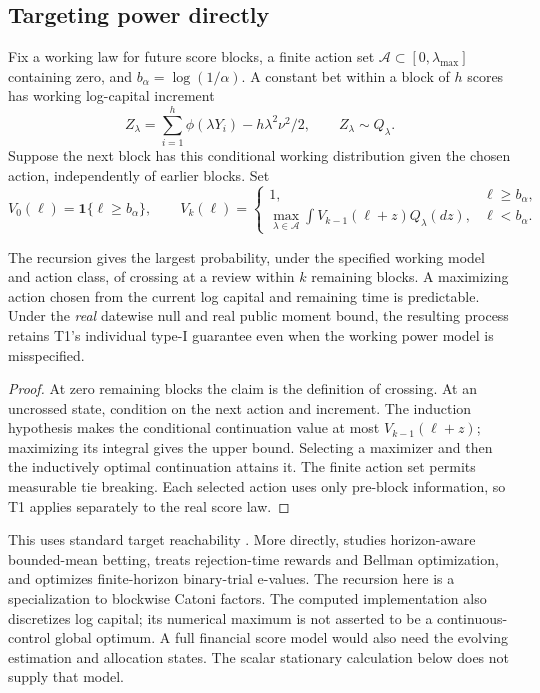 \subsection{Targeting power directly}
Fix a working law for future score blocks, a finite action set
$\mathcal A\subset[0,\lambda_{\max}]$ containing zero, and
$b_\alpha=\log(1/\alpha)$. A constant bet within a block of $h$ scores has
working log-capital increment
\[
 Z_\lambda=\sum_{i=1}^h\phi(\lambda Y_i)-h\lambda^2\nu^2/2,
 \qquad Z_\lambda\sim Q_\lambda.
\]
Suppose the next block has this conditional working distribution given the
chosen action, independently of earlier blocks. Set
\begin{equation}
 V_0(\ell)=\mathbf1\{\ell\ge b_\alpha\},\qquad
 V_k(\ell)=
 \begin{cases}
 1,&\ell\ge b_\alpha,\\
 \displaystyle\max_{\lambda\in\mathcal A}
       \int V_{k-1}(\ell+z)Q_\lambda(dz),&\ell<b_\alpha.
 \end{cases}\label{eq:power-bellman}
\end{equation}
\begin{proposition}
The recursion gives the largest probability, under the specified working
model and action class, of crossing at a review within $k$ remaining blocks.
A maximizing action chosen from the current log capital and remaining time
is predictable. Under the \emph{real} datewise null and real public moment
bound, the resulting process retains T1's individual type-I guarantee even
when the working power model is misspecified.
\end{proposition}
\begin{proof}
At zero remaining blocks the claim is the definition of crossing. At an
uncrossed state, condition on the next action and increment. The induction
hypothesis makes the conditional continuation value at most
$V_{k-1}(\ell+z)$; maximizing its integral gives the upper bound. Selecting a
maximizer and then the inductively optimal continuation attains it. The
finite action set permits measurable tie breaking. Each selected action uses
only pre-block information, so T1 applies separately to the real score law.
\end{proof}
This uses standard target reachability \cite{reachability}. More directly,
\cite{taga} studies horizon-aware bounded-mean betting, \cite{clerico} treats
rejection-time rewards and Bellman optimization, and \cite{baas} optimizes
finite-horizon binary-trial e-values. The recursion here is a specialization
to blockwise Catoni factors. The computed implementation also discretizes log capital; its numerical maximum
is not asserted to be a continuous-control global optimum. A full financial
score model would also need the evolving estimation and allocation states.
The scalar stationary calculation below does not supply that model.

